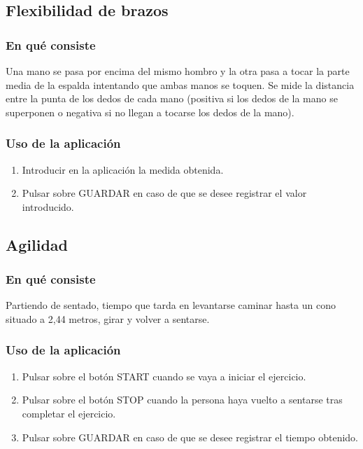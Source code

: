 \subsection{Flexibilidad de brazos}

\subsubsection{En qué consiste}

Una mano se pasa por encima del mismo hombro y la otra pasa a tocar la parte media de la espalda intentando que ambas manos se toquen. Se mide la distancia entre la punta de los dedos de cada mano (positiva si los dedos de la mano se superponen o negativa si no llegan a tocarse los dedos de la mano).

\subsubsection{Uso de la aplicación}

\begin{enumerate}
\item Introducir en la aplicación la medida obtenida.
\item Pulsar sobre GUARDAR en caso de que se desee registrar el valor introducido.
\end{enumerate}

\subsection{Agilidad}

\subsubsection{En qué consiste}

Partiendo de sentado, tiempo que tarda en levantarse caminar hasta un cono situado a 2,44 metros, girar y volver a sentarse.

\subsubsection{Uso de la aplicación}

\begin{enumerate}
\item Pulsar sobre el botón START cuando se vaya a iniciar el ejercicio.
\item Pulsar sobre el botón STOP cuando la persona haya vuelto a sentarse tras completar el ejercicio.
\item Pulsar sobre GUARDAR en caso de que se desee registrar el tiempo obtenido.
\end{enumerate}

